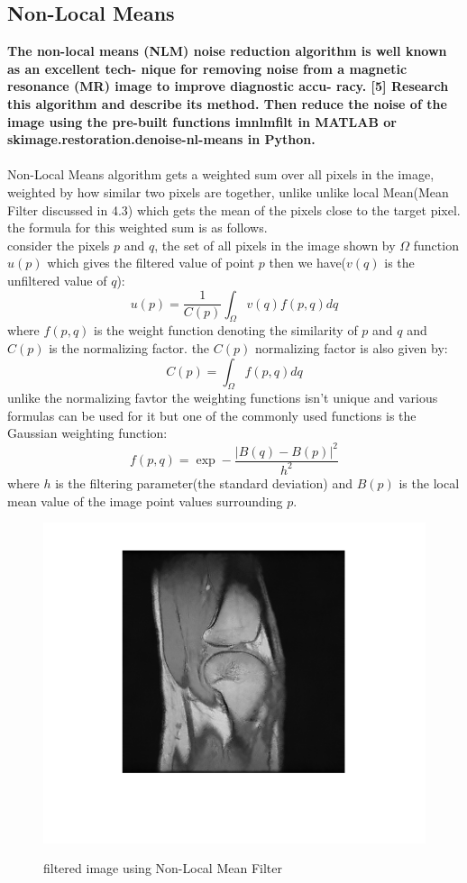 \documentclass[11pt]{article}
\begin{document}
\subsection{Non-Local Means}
\textbf{The non-local means (NLM) noise reduction algorithm is well known as an excellent tech-
nique for removing noise from a magnetic resonance (MR) image to improve diagnostic accu-
racy. [5] Research this algorithm and describe its method. Then reduce the noise of the image
using the pre-built functions imnlmfilt in MATLAB or skimage.restoration.denoise-nl-means in
Python.} \\
\vspace{5pt} \\
Non-Local Means algorithm gets a weighted sum over all pixels in the image,
weighted by how similar two pixels are together, unlike unlike local Mean(Mean Filter discussed in 4.3)
which gets the mean of the pixels close to the target pixel. the formula for this weighted sum is as follows. \\
consider the pixels $p$ and $q$, the set of all pixels in the image shown by $\Omega$
function $u(p)$ which gives the filtered value of point $p$ then we have($v(q)$ is the unfiltered value of $q$):
$$  u(p) = \frac{1}{C(p)}\int_{\Omega} v(q)f(p,q)dq $$
where $f(p,q)$ is the weight function denoting the similarity of $p$ and $q$ and $C(p)$ is the normalizing factor.
the $C(p)$ normalizing factor is also given by:
$$ C(p) = \int_{\Omega}f(p,q)dq $$
unlike the normalizing favtor the weighting functions isn't unique
and various formulas can be used for it but one of the commonly used functions is
the Gaussian weighting function:
$$ f(p, q) = \exp -\frac{|B(q) - B(p)|^2}{h^2}$$
where $h$ is the filtering parameter(the standard deviation) and $B(p)$
is the local mean value of the image point values surrounding $p$.
\begin{figure}[H]
    \begin{center}
        \includegraphics[scale=0.6]{Fig/non-local.mean.png}
        \label{fig:Non-LocalKnee}
        \caption{filtered image using Non-Local Mean Filter}
    \end{center}
\end{figure}
\end{document}
